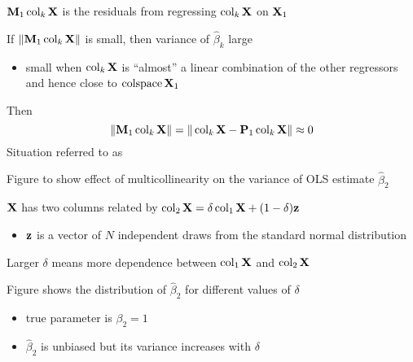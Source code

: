 \begin{frame}

    \vspace{2em}
    $\mathbf M_1 \operatorname{col}_k \mathbf X$ is the residuals from regressing 
    $\operatorname{col}_k \mathbf X$ on $\mathbf X_1$
    
    If $\|\mathbf M_1 \operatorname{col}_k \mathbf X\|$ is small, then variance of $\hat \beta_k$ large
    \begin{itemize}
        \item small when $\operatorname{col}_k \mathbf X$ is
    ``almost'' a linear combination of the other regressors and hence
    close to $\operatorname{colspace} \mathbf X_1$
    \end{itemize}
    
    \vspace{.7em}
    Then
    \begin{equation*}
        \| \mathbf M_1 \operatorname{col}_k \mathbf X \| =
            \| \operatorname{col}_k \mathbf X  - \mathbf P_1 \operatorname{col}_k \mathbf X  \| \approx 0
    \end{equation*}
    Situation referred to as 
    
\end{frame}


\begin{frame}
 
    \vspace{2em}
    Figure to show  effect of
    multicollinearity on the variance of OLS estimate $\hat \beta_2$
    
    $\mathbf X$ has two columns related by $\operatorname{col}_2 \mathbf X = \delta \operatorname{col}_1
    \mathbf X + (1 - \delta) {\mathbf z}$
    
    \begin{itemize}
        \item ${\mathbf z}$ is a vector of $N$ independent draws from 
            the standard normal distribution
    \end{itemize}
    
    \vspace{.7em}
    Larger $\delta$ means more
    dependence between $\operatorname{col}_1 \mathbf X$ and $\operatorname{col}_2 \mathbf X$
    
    Figure shows the distribution of $\hat \beta_2$ for different values of
    $\delta$
    \begin{itemize}
        \item true parameter is $\beta_2 = 1$
        \item $\hat \beta_2$ is unbiased but its variance increases
    with $\delta$
    \end{itemize}
    
\end{frame}


